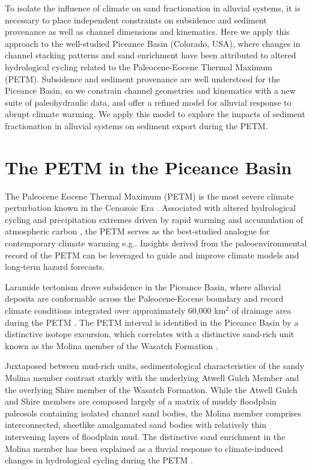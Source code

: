 \documentclass[draft]{compact_proposal}\usepackage[]{graphicx}\usepackage[]{color}
\newcommand{\del}[3]{\ce{\delta^#1#2_{#3}}}
\begin{document}
To isolate the influence of climate on sand fractionation in alluvial systems, it is necessary to place independent constraints on subsidence and sediment provenance as well as channel dimensions and kinematics.
Here we apply this approach to the well-studied Piceance Basin (Colorado, USA), where changes in channel stacking patterns and sand enrichment have been attributed to altered hydrological cycling related to the Paleocene-Eocene Thermal Maximum (PETM).
Subsidence and sediment provenance are well understood for the Piceance Basin, so we constrain channel geometries and kinematics with a new suite of paleohydraulic data, and offer a refined model for alluvial response to abrupt climate warming. We apply this model to explore the impacts of sediment fractionation in alluvial systems on sediment export during the PETM.

\section{The PETM in the Piceance Basin}

The Paleocene Eocene Thermal Maximum (PETM) is the most severe climate perturbation known in the Cenozoic Era \parencite{zachos_early_2008, slotnick_large_2012}.
Associated with altered hydrological cycling and precipitation extremes driven by rapid warming and accumulation of atmospheric carbon \parencite{carmichael_hydrological_2017}, the PETM serves as the best-studied analogue for contemporary climate warming e.g.\cnote.
Insights derived from the paleoenvironmental record of the PETM can be leveraged to guide and improve climate models and long-term hazard forecasts.

Laramide tectonism drove subsidence in the Piceance Basin, where alluvial deposits are conformable across the Paleocene-Eocene boundary and record climate conditions integrated over approximately 60,000 km$^2$ of drainage area during the PETM \cnote[johnson].
The PETM interval is identified in the Piceance Basin by a distinctive \del{13}{C}{} isotope excursion, which correlates with a distinctive sand-rich unit known as the Molina member of the Wasatch Formation \parencite{foreman_fluvial_2012}.

Juxtaposed between mud-rich units, sedimentological characteristics of the sandy Molina member contrast starkly with the underlying Atwell Gulch Member and the overlying Shire member of the Wasatch Formation.
While the Atwell Gulch and Shire members are composed largely of a matrix of muddy floodplain paleosols containing isolated channel sand bodies, the Molina member comprises interconnected, sheetlike amalgamated sand bodies with relatively thin intervening layers of floodplain mud.
The distinctive sand enrichment in the Molina member has been explained as a fluvial response to climate-induced changes in hydrological cycling during the PETM \parencite{foreman_fluvial_2012}.
\end{document}
